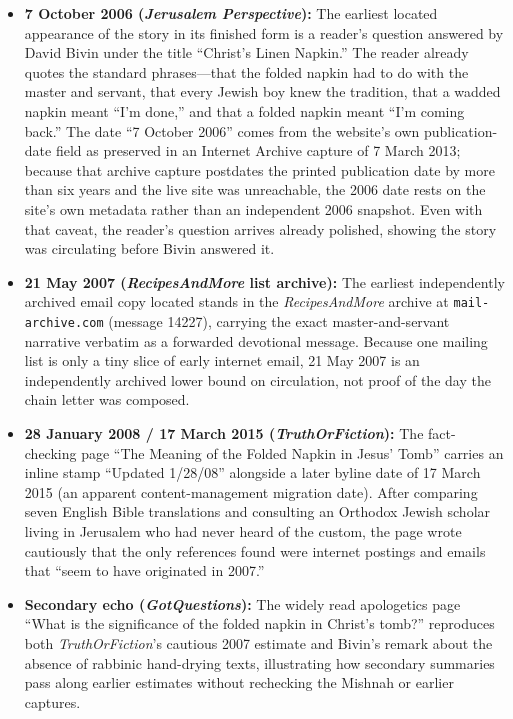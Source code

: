 \begin{itemize}
\item \textbf{7 October 2006 (\emph{Jerusalem Perspective}):} The earliest located appearance of the story in its finished form is a reader's question answered by David Bivin under the title ``Christ's Linen Napkin.'' The reader already quotes the standard phrases---that the folded napkin had to do with the master and servant, that every Jewish boy knew the tradition, that a wadded napkin meant ``I'm done,'' and that a folded napkin meant ``I'm coming back.'' The date ``7 October 2006'' comes from the website's own publication-date field as preserved in an Internet Archive capture of 7 March 2013; because that archive capture postdates the printed publication date by more than six years and the live site was unreachable, the 2006 date rests on the site's own metadata rather than an independent 2006 snapshot. Even with that caveat, the reader's question arrives already polished, showing the story was circulating before Bivin answered it.
\item \textbf{21 May 2007 (\emph{RecipesAndMore} list archive):} The earliest independently archived email copy located stands in the \emph{RecipesAndMore} archive at \texttt{mail-archive.com} (message 14227), carrying the exact master-and-servant narrative verbatim as a forwarded devotional message. Because one mailing list is only a tiny slice of early internet email, 21 May 2007 is an independently archived lower bound on circulation, not proof of the day the chain letter was composed.
\item \textbf{28 January 2008 / 17 March 2015 (\emph{TruthOrFiction}):} The fact-checking page ``The Meaning of the Folded Napkin in Jesus' Tomb'' carries an inline stamp ``Updated 1/28/08'' alongside a later byline date of 17 March 2015 (an apparent content-management migration date). After comparing seven English Bible translations and consulting an Orthodox Jewish scholar living in Jerusalem who had never heard of the custom, the page wrote cautiously that the only references found were internet postings and emails that ``seem to have originated in 2007.''
\item \textbf{Secondary echo (\emph{GotQuestions}):} The widely read apologetics page ``What is the significance of the folded napkin in Christ's tomb?'' reproduces both \emph{TruthOrFiction}'s cautious 2007 estimate and Bivin's remark about the absence of rabbinic hand-drying texts, illustrating how secondary summaries pass along earlier estimates without rechecking the Mishnah or earlier captures.
\end{itemize}

